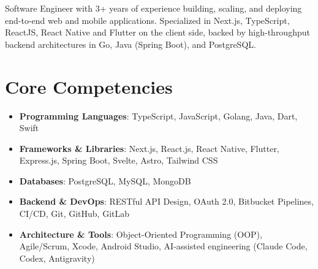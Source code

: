 \documentclass[11pt,a4paper,sans]{moderncv}
\begin{document}
\makecvtitle


\vspace{6pt}
\small{Software Engineer with 3+ years of experience building, scaling, and deploying end-to-end web and mobile applications. Specialized in Next.js, TypeScript, ReactJS, React Native and Flutter on the client side, backed by high-throughput backend architectures in Go, Java (Spring Boot), and PostgreSQL.}


\section{Core Competencies}
\vspace{1pt}
\begin{itemize}
\item \textbf{Programming Languages}: TypeScript, JavaScript, Golang, Java, Dart, Swift
\item \textbf{Frameworks \& Libraries}: Next.js, React.js, React Native, Flutter, Express.js, Spring Boot, Svelte, Astro, Tailwind CSS
\item \textbf{Databases}: PostgreSQL, MySQL, MongoDB
\item \textbf{Backend \& DevOps}: RESTful API Design, OAuth 2.0, Bitbucket Pipelines, CI/CD, Git, GitHub, GitLab
\item \textbf{Architecture \& Tools}: Object-Oriented Programming (OOP), Agile/Scrum, Xcode, Android Studio, AI-assisted engineering (Claude Code, Codex, Antigravity)
\end{itemize}

\end{document}
